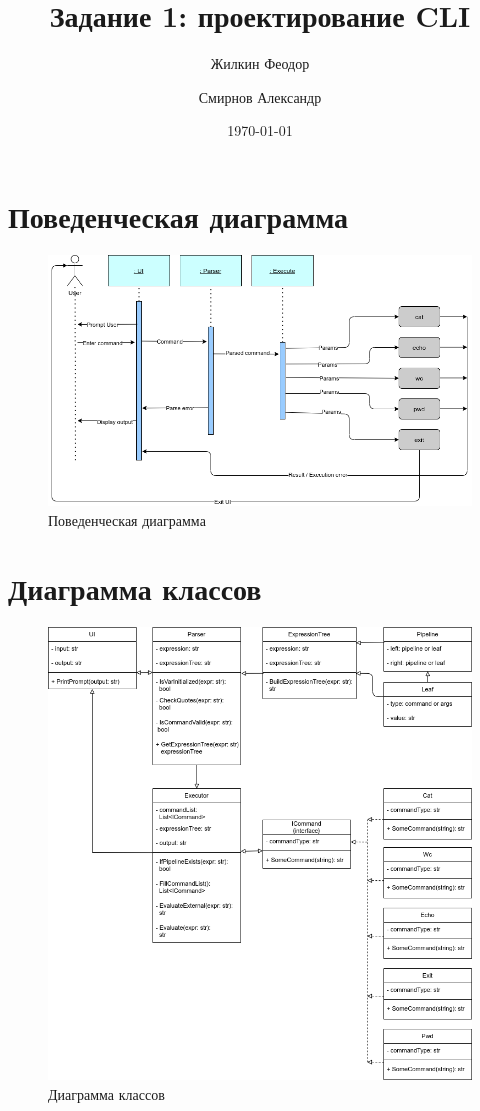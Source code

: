 \documentclass[a4paper,10pt]{article}
\title{Задание 1: проектирование CLI}
\author{
	Жилкин Феодор\\
	\and
	Смирнов Александр
}
\date{\today}
\begin{document}
\maketitle

\section*{Поведенческая диаграмма}

\begin{figure}[h]
	\centering
	\includegraphics[width=\textwidth]{images/activity_diagram.png}
	\caption{Поведенческая диаграмма}
	\centering
\end{figure}

\newpage

\section*{Диаграмма классов}

\begin{figure}[h!]
	\centering
	\includegraphics[width=\textwidth]{images/class_diagram.png}
	\caption{Диаграмма классов}
	\centering
\end{figure}
\end{document}
